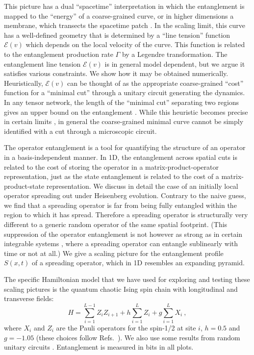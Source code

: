 \documentclass[aps,prx,twocolumn,superscriptaddress,floatfix,nofootinbib,prx]{revtex4}
\renewcommand{\>}{\right\rangle}
\newcommand{\<}{\left\langle}
\newcommand{\blue}{}
\newcommand{\lt}{\mathcal{E}}
\begin{document}
This picture has a dual ``spacetime'' interpretation 
in which the entanglement is mapped to the ``energy'' of a coarse-grained  curve, or in higher dimensions a membrane, which transects the spacetime patch \cite{nahum}.  In the scaling limit, this curve has a well-defined geometry that is determined by a ``line tension'' function $\lt(v)$ which depends on the local velocity of the curve. This function is related to the  entanglement production rate $\Gamma$ by a  Legendre transformation.
The entanglement line tension $\lt(v)$ is in general model dependent,  but we argue it satisfies various constraints.  We show how it may be obtained numerically.
Heuristically, $\lt(v)$ can be thought of as the appropriate coarse-grained ``cost'' function for a ``minimal cut'' through a unitary circuit generating the dynamics. In any tensor network, the length of the ``minimal cut'' separating two regions gives an upper bound on the entanglement \cite{swingleentanglementrenormalization, casini,pastawski,hayden}.
While this heuristic becomes precise in certain limits \cite{nahum}, in general  the coarse-grained minimal curve cannot be simply identified with a cut through a microscopic circuit.

The operator entanglement is a tool for quantifying the structure of  an operator in a basis-independent manner.
In 1D, the entanglement across spatial cuts is related to the cost of storing the operator in a  matrix-product-operator representation, just as the state entanglement is related to the cost of a matrix-product-state representation.
We discuss in detail the case of an initially local operator spreading out under Heisenberg evolution.
Contrary to the naive guess, we find that a spreading operator is far from being fully entangled within the region to which it has spread. 
Therefore a spreading operator is structurally very different to a generic random operator of the same spatial footprint. (This suppression of the operator entanglement is not however as strong as in certain integrable systems \cite{prosenpizorn,prosenpizorn2,dubail}, where a spreading operator can entangle sublinearly with time or not at all.) We give a scaling picture for the entanglement profile $S(x,t)$ of a spreading operator, which in 1D resembles an expanding pyramid.

The specific Hamiltonian model that we have used for exploring and testing these scaling pictures is the
quantum chaotic Ising spin chain with longitudinal and transverse fields:
\begin{equation}
H=\sum_{i=1}^{L-1} Z_i Z_{i+1} + h\sum_{i=1}^L Z_i + g\sum_{i=1}^L X_i ~,
    \label{eq:ham}
\end{equation}
where $X_i$ and $Z_i$ are the Pauli operators for the spin-1/2 at site $i$, $h=0.5$ and $g=-1.05$ (these choices follow Refs.~\cite{ms,mcb}).
We also use some results from random unitary circuits \cite{nahum,nahum3,keyserlingk,nahum2,amosandreajohn, zhounahum}.
{\blue Entanglement is measured in bits in all plots.}
\end{document}
